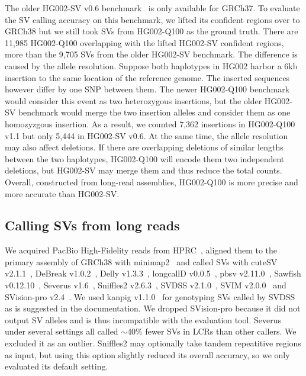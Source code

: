 \documentclass[a4paper,num-refs]{oup-contemporary}
\begin{document}
The older HG002-SV v0.6 benchmark~\cite{Zook:2020aa} is only available for GRCh37.
To evaluate the SV calling accuracy on this benchmark,
we lifted its confident regions over to GRCh38
but we still took SVs from HG002-Q100 as the ground truth.
There are 11,985 HG002-Q100 overlapping with the lifted HG002-SV confident regions,
more than the 9,705 SVs from the older HG002-SV benchmark.
The difference is caused by the allele resolution.
Suppose both haplotypes in HG002 harbor a 6kb insertion to the same location of the reference genome.
The inserted sequences however differ by one SNP between them.
The newer HG002-Q100 benchmark
would consider this event as two heterozygous insertions,
but the older HG002-SV benchmark would merge the two insertion alleles and consider them as one homozyzgous insertion.
As a result, we counted 7,362 insertions in HG002-Q100 v1.1 but only 5,444 in HG002-SV v0.6.
At the same time, the allele resolution may also affect deletions.
If there are overlapping deletions of similar lengths between the two haplotypes,
HG002-Q100 will encode them two independent deletions,
but HG002-SV may merge them and thus reduce the total counts.
Overall, constructed from long-read assemblies, HG002-Q100 is more precise and more accurate than HG002-SV.

\subsection{Calling SVs from long reads}

We acquired PacBio High-Fidelity reads from HPRC~\cite{hifi-read},
aligned them to the primary assembly of GRCh38 with minimap2~\cite{Li:2018ab}
and called SVs with
cuteSV v2.1.1~\cite{Jiang:2020aa},
DeBreak v1.0.2~\cite{Chen:2023aa},
Delly v1.3.3~\cite{Rausch:2012aa},
longcallD v0.0.5~\cite{longcalld},
pbsv v2.11.0~\cite{pbsv},
Sawfish v0.12.10~\cite{Saunders:2025aa},
Severus v1.6~\cite{Keskus:2025aa},
Sniffles2 v2.6.3~\cite{Smolka:2024ab},
SVDSS v2.1.0~\cite{Denti:2023aa},
SVIM v2.0.0~\cite{Heller:2019aa}
and SVision-pro v2.4~\cite{Wang:2025aa}.
We used kanpig v1.1.0~\cite{English:2025aa} for genotyping SVs called by SVDSS as is suggested in the documentation.
We dropped SVision-pro because it did not output SV alleles and is thus incompatible with the evaluation tool.
Severus under several settings all called $\sim$40\% fewer SVs in LCRs than other callers.
We excluded it as an outlier.
Sniffles2 may optionally take tandem repeatitive regions as input,
but using this option slightly reduced its overall accuracy, so we only evaluated its default setting.
\end{document}
